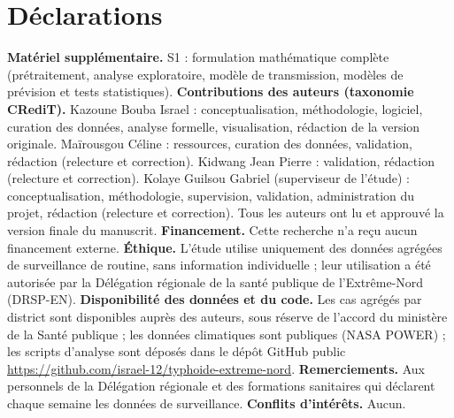 \documentclass[11pt]{article}
\begin{document}
\section*{Déclarations}
\small
\textbf{Matériel supplémentaire.} S1 : formulation mathématique complète (prétraitement, analyse exploratoire, modèle de transmission, modèles de prévision et tests statistiques).
\textbf{Contributions des auteurs (taxonomie CRediT).} Kazoune Bouba Israel : conceptualisation, méthodologie, logiciel, curation des données, analyse formelle, visualisation, rédaction de la version originale. Maïrousgou Céline : ressources, curation des données, validation, rédaction (relecture et correction). Kidwang Jean Pierre : validation, rédaction (relecture et correction). Kolaye Guilsou Gabriel (superviseur de l'étude) : conceptualisation, méthodologie, supervision, validation, administration du projet, rédaction (relecture et correction). Tous les auteurs ont lu et approuvé la version finale du manuscrit.
\textbf{Financement.} Cette recherche n'a reçu aucun financement externe.
\textbf{Éthique.} L'étude utilise uniquement des données agrégées de surveillance de routine, sans information individuelle ; leur utilisation a été autorisée par la Délégation régionale de la santé publique de l'Extrême-Nord (DRSP-EN).
\textbf{Disponibilité des données et du code.} Les cas agrégés par district sont disponibles auprès des auteurs, sous réserve de l'accord du ministère de la Santé publique ; les données climatiques sont publiques (NASA POWER) ; les scripts d'analyse sont déposés dans le dépôt GitHub public \url{https://github.com/israel-12/typhoide-extreme-nord}.
\textbf{Remerciements.} Aux personnels de la Délégation régionale et des formations sanitaires qui déclarent chaque semaine les données de surveillance.
\textbf{Conflits d'intérêts.} Aucun.
\end{document}
